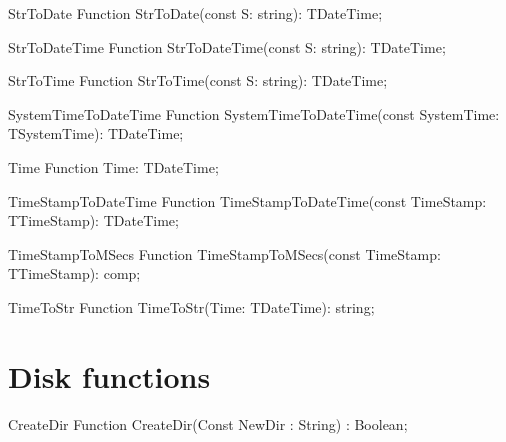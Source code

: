  
\begin{function}{StrToDate}
\Declaration
Function StrToDate(const S: string): TDateTime;
\Description
\Errors
\SeeAlso
\end{function}

 
\begin{function}{StrToDateTime}
\Declaration
Function StrToDateTime(const S: string): TDateTime;
\Description
\Errors
\SeeAlso
\end{function}

 
\begin{function}{StrToTime}
\Declaration
Function StrToTime(const S: string): TDateTime;
\Description
\Errors
\SeeAlso
\end{function}

 
\begin{function}{SystemTimeToDateTime}
\Declaration
Function SystemTimeToDateTime(const SystemTime: TSystemTime): TDateTime;
\Description
\Errors
\SeeAlso
\end{function}

 
\begin{function}{Time}
\Declaration
Function Time: TDateTime;
\Description
\Errors
\SeeAlso
\end{function}

 
\begin{function}{TimeStampToDateTime}
\Declaration
Function TimeStampToDateTime(const TimeStamp: TTimeStamp): TDateTime;
\Description
\Errors
\SeeAlso
\end{function}

 
\begin{function}{TimeStampToMSecs}
\Declaration
Function TimeStampToMSecs(const TimeStamp: TTimeStamp): comp;
\Description
\Errors
\SeeAlso
\end{function}

 
\begin{function}{TimeToStr}
\Declaration
Function TimeToStr(Time: TDateTime): string;
\Description
\Errors
\SeeAlso
\end{function}

 

\section{Disk functions}

\begin{function}{CreateDir}
\Declaration
Function CreateDir(Const NewDir : String) : Boolean;
\Description
\Errors
\SeeAlso
\end{function}

